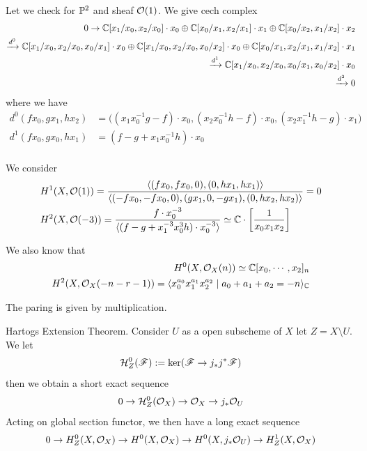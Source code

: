{Let we check for $\P^2$ and sheaf $\o(1)$. We give cech complex 
\begin{align*}
    0\to \C[x_1/x_0,x_2/x_0]\cdot x_0\oplus \C[x_0/x_1,x_2/x_1]\cdot x_1 \oplus \C[x_0/x_2,x_1/x_2]\cdot x_2 
    \\ \xrightarrow{d^0} \C[x_1/x_0,x_2/x_0,x_0/x_1]\cdot x_0 \oplus \C[x_1/x_0,x_2/x_0,x_0/x_2]\cdot x_0 \oplus \C[x_0/x_1,x_2/x_1,x_1/x_2]\cdot x_1
    \\ \xrightarrow{d^1} \C[x_1/x_0,x_2/x_0,x_0/x_1,x_0/x_2]\cdot x_0 
    \\ \xrightarrow{d^2} 0
\end{align*}
where we have 
\begin{align*}
    d^0(fx_0,gx_1,hx_2) &= \big((x_1x_0^{-1}g-f)\cdot x_0,(x_2x_0^{-1}h-f)\cdot x_0, (x_2x_1^{-1}h-g)\cdot x_1\big)\\
    d^1(fx_0,gx_0,hx_1) &= (f-g+x_1x_0^{-1}h)\cdot x_0 \\
\end{align*}

We consider 
\begin{align*}
    &H^1(X,\o(1))= \frac{\langle (fx_0,fx_0,0), (0,hx_1,hx_1)\rangle}{\langle(-fx_0,-fx_0,0 ),(gx_1,0,-gx_1),(0,hx_2,hx_2)\rangle} =0\\
    &H^2(X,\o(-3)) = \frac{f\cdot x_0^{-3}}{\langle (f-g+x_1^{-3}x_0^3h)\cdot x_0^{-3} \rangle} \simeq \C\cdot \left[\frac{1}{x_0x_1x_2}\right]
\end{align*}

We also know that 
\begin{align*}
    H^0(X,\o_X(n))\simeq \C[x_0,\cdots,x_2]_n\\
    H^2(X,\o_X(-n-r-1)) = \langle x_0^{a_0}x_1^{a_1}x_2^{a_2}\mid a_0+a_1+a_2=-n\rangle_{\C}
\end{align*}

The paring is given by multiplication.

\np Hartogs Extension Theorem. Consider $U$ as a open subscheme of $X$ let $Z=X\setminus U$.
We let 
\begin{align*}
    \calH^0_Z(\f):=\ker(\f\to j_*j^*\f)
\end{align*}
then we obtain a short exact sequence
\begin{align*}
    0\to \calH^0_Z(\o_X) \to \o_X \to j_*\o_U 
\end{align*}
Acting on global section functor, we then have a long exact sequence 
\begin{align*}
    0\to H^0_Z(X,\o_X) \to H^0(X,\o_X) \to H^0(X,j_*\o_U) \to  H^1_Z(X,\o_X)
\end{align*}

}
